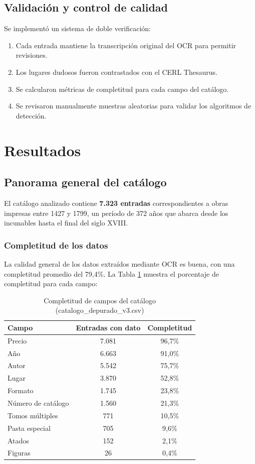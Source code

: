 \documentclass[12pt,a4paper]{article}
\begin{document}
\subsection{Validación y control de calidad}

Se implementó un sistema de doble verificación:

\begin{enumerate}
    \item Cada entrada mantiene la transcripción original del OCR para permitir revisiones.
    \item Los lugares dudosos fueron contrastados con el CERL Thesaurus.
    \item Se calcularon métricas de completitud para cada campo del catálogo.
    \item Se revisaron manualmente muestras aleatorias para validar los algoritmos de detección.
\end{enumerate}

\section{Resultados}

\subsection{Panorama general del catálogo}

El catálogo analizado contiene \textbf{7.323 entradas} correspondientes a obras impresas entre 1427 y 1799, un período de 372 años que abarca desde los incunables hasta el final del siglo XVIII.

\subsubsection{Completitud de los datos}

La calidad general de los datos extraídos mediante OCR es buena, con una completitud promedio del 79,4\%. La Tabla \ref{tab:completitud} muestra el porcentaje de completitud para cada campo:

\begin{table}[h]
\centering
\caption{Completitud de campos del catálogo (catalogo\_depurado\_v3.csv)}
\label{tab:completitud}
\begin{tabular}{lcc}
\toprule
\textbf{Campo} & \textbf{Entradas con dato} & \textbf{Completitud} \\
\midrule
Precio & 7.081 & 96,7\% \\
Año & 6.663 & 91,0\% \\
Autor & 5.542 & 75,7\% \\
Lugar & 3.870 & 52,8\% \\
Formato & 1.745 & 23,8\% \\
Número de catálogo & 1.560 & 21,3\% \\
Tomos múltiples & 771 & 10,5\% \\
Pasta especial & 705 & 9,6\% \\
Atados & 152 & 2,1\% \\
Figuras & 26 & 0,4\% \\
\bottomrule
\end{tabular}
\end{table}
\end{document}
